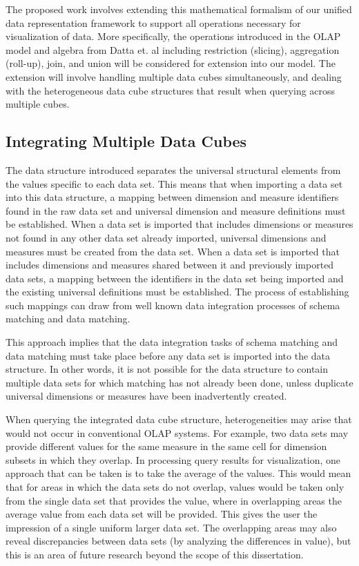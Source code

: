 \documentclass[12pt]{article}
\begin{document}
\begin{doublespace}
The proposed work involves extending this mathematical formalism of our unified data representation framework to support all operations necessary for visualization of data. More specifically, the operations introduced in the OLAP model and algebra from Datta et. al \cite{datta1999cube} including restriction (slicing), aggregation (roll-up), join, and union will be considered for extension into our model. The extension will involve handling multiple data cubes simultaneously, and dealing with the heterogeneous data cube structures that result when querying across multiple cubes.

\subsection{Integrating Multiple Data Cubes}
The data structure introduced separates the universal structural elements from the values specific to each data set. This means that when importing a data set into this data structure, a mapping between dimension and measure identifiers found in the raw data set and universal dimension and measure definitions must be established. When a data set is imported that includes dimensions or measures not found in any other data set already imported, universal dimensions and measures must be created from the data set. When a data set is imported that includes dimensions and measures shared between it and previously imported data sets, a mapping between the identifiers in the data set being imported and the existing universal definitions must be established. The process of establishing such mappings can draw from well known data integration processes of schema matching and data matching.

This approach implies that the data integration tasks of schema matching and data matching must take place before any data set is imported into the data structure. In other words, it is not possible for the data structure to contain multiple data sets for which matching has not already been done, unless duplicate universal dimensions or measures have been inadvertently created.

When querying the integrated data cube structure, heterogeneities may arise that would not occur in conventional OLAP systems. For example, two data sets may provide different values for the same measure in the same cell for dimension subsets in which they overlap. In processing query results for visualization, one approach that can be taken is to take the average of the values. This would mean that for areas in which the data sets do not overlap, values would be taken only from the single data set that provides the value, where in overlapping areas the average value from each data set will be provided. This gives the user the impression of a single uniform larger data set. The overlapping areas may also reveal discrepancies between data sets (by analyzing the differences in value), but this is an area of future research beyond the scope of this dissertation.

\end{doublespace}
\end{document}
